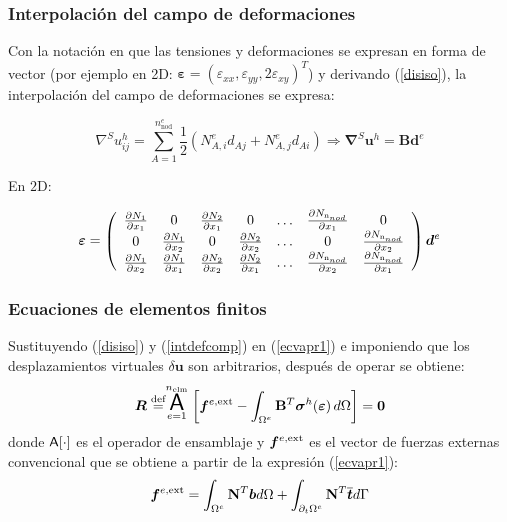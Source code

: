 \documentclass[10pt, aspectratio=43]{beamer}
\begin{document}
\begin{frame}
\frametitle{Interpolación del campo de deformaciones}

Con la notación en que las tensiones y
deformaciones se expresan en forma de vector (por ejemplo en 2D:
$\bm{\varepsilon}=(\varepsilon_{xx},\varepsilon_{yy},2
\varepsilon_{xy})^T$) y derivando (\ref{disiso}), la interpolación del campo
de deformaciones se expresa:
\begin{small}
\begin{equation}
\nabla^S u^h_{ij}=\sum_{A=1}^{n^e_{\textrm{nod}}}
\frac{1}{2}\left(N^e_{A,i} d_{Aj}+N^e_{A,j} d_{Ai}
\right) \Rightarrow
\bm{\nabla}^{S}\bm{u}^h=\mathbf{B} \bm{d}^e \label{intdefcomp}
\end{equation}
\end{small}
En $2$D:
\begin{small}
\begin{equation}
\bm{\varepsilon}=
\left(
\begin{array}{ccccccc}
\frac{\partial N_1}{\partial x_1} & 0 &\frac{\partial N_2}{\partial x_1} &0 &
\ldots & \frac{\partial N_{\textrm n_{nod}}}{\partial x_1} & 0 \\
0 & \frac{\partial N_1}{\partial x_2} & 0 &\frac{\partial N_2}{\partial x_2} &
\ldots & 0 & \frac{\partial N_{\textrm n_{nod}}}{\partial x_2} \\
\frac{\partial N_1}{\partial x_2} &\frac{\partial N_1}{\partial x_1} &
\frac{\partial N_2}{\partial x_2} &\frac{\partial N_2}{\partial x_1} &
\ldots & \frac{\partial N_{\textrm n_{nod}}}{\partial x_2} &\frac{\partial
N_{\textrm n_{nod}}}{\partial x_1}
\end{array}
\right)\bm{d}^e
\end{equation}
\end{small}
\end{frame}
\begin{frame}
\frametitle{Ecuaciones de elementos finitos}
Sustituyendo (\ref{disiso}) y (\ref{intdefcomp}) en (\ref{ecvapr1})
e imponiendo que los desplazamientos virtuales $\delta \bm{u}$ son arbitrarios,
después de operar se obtiene:
\begin{equation}
\bm{R}\stackrel{\textrm{def}}{=}\stackrel{n_{\textrm{elm}}}{
\underset{e=1}{\mbox{\LARGE{\bf {\sf A}}}}} \left[
\bm{f}^{e,{\rm ext}}-\int_{\Omega^e}
\mathbf{B}^{T} \bm{\sigma}^{h}(\bm{\varepsilon})
\,d\Omega \right] = \bm{0} \label{resmef1}
\end{equation}
donde ${\Large \bf{\sf A}[\cdot]}$ es el operador de ensamblaje y
$\bm{f}^{e,{\rm ext}}$
es el vector de fuerzas externas convencional que se obtiene a partir de la
expresión (\ref{ecvapr1}):
\begin{equation}
\bm{f}^{e,{\rm ext}}=\int_{\Omega^e} \mathbf{N}^{T} \bm{b} d\Omega+
\int_{\partial_t \Omega^e} \mathbf{N}^{T} \overline{\bm{t}} d \Gamma
\label{fexter}
\end{equation}
\end{frame}
\end{document}
